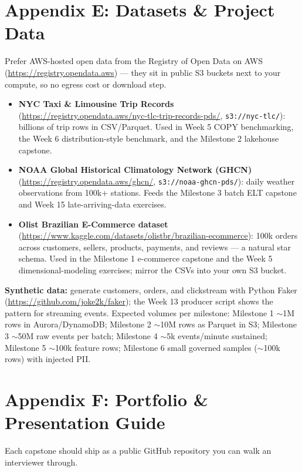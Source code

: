 \documentclass[11pt, a4paper]{article}
\begin{document}
\section{Appendix E: Datasets \& Project Data}
Prefer AWS-hosted open data from the Registry of Open Data on AWS (\url{https://registry.opendata.aws}) --- they sit in public S3 buckets next to your compute, so no egress cost or download step.

\begin{itemize}[label=-]
    \item \textbf{NYC Taxi \& Limousine Trip Records} (\url{https://registry.opendata.aws/nyc-tlc-trip-records-pds/}, \texttt{s3://nyc-tlc/}): billions of trip rows in CSV/Parquet. Used in Week 5 COPY benchmarking, the Week 6 distribution-style benchmark, and the Milestone 2 lakehouse capstone.
    \item \textbf{NOAA Global Historical Climatology Network (GHCN)} (\url{https://registry.opendata.aws/ghcn/}, \texttt{s3://noaa-ghcn-pds/}): daily weather observations from 100k+ stations. Feeds the Milestone 3 batch ELT capstone and Week 15 late-arriving-data exercises.
    \item \textbf{Olist Brazilian E-Commerce dataset} (\url{https://www.kaggle.com/datasets/olistbr/brazilian-ecommerce}): 100k orders across customers, sellers, products, payments, and reviews --- a natural star schema. Used in the Milestone 1 e-commerce capstone and the Week 5 dimensional-modeling exercises; mirror the CSVs into your own S3 bucket.
\end{itemize}

\noindent\textbf{Synthetic data:} generate customers, orders, and clickstream with Python Faker (\url{https://github.com/joke2k/faker}); the Week 13 producer script shows the pattern for streaming events. Expected volumes per milestone: Milestone 1 $\sim$1M rows in Aurora/DynamoDB; Milestone 2 $\sim$10M rows as Parquet in S3; Milestone 3 $\sim$50M raw events per batch; Milestone 4 $\sim$5k events/minute sustained; Milestone 5 $\sim$100k feature rows; Milestone 6 small governed samples ($\sim$100k rows) with injected PII.

\section{Appendix F: Portfolio \& Presentation Guide}
Each capstone should ship as a public GitHub repository you can walk an interviewer through.
\end{document}
